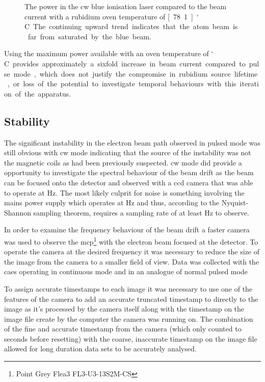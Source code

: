 \begin{figure}
    \center
    
    \caption[Beam current and ionisation laser power.]{The power in the \gls{cw} blue ionisation laser compared to the beam current with a rubidium oven temperature of \unit[78.1]{$^\circ$C}.
    The continuing upward trend indicates that the atom beam is far from saturated by the blue beam.}
    \label{figure:blue_power}
\end{figure}

Using the maximum power available with an oven temperature of \unit[200]{$^\circ$C} provides approximately a sixfold increase in beam current compared to pulse mode, which does not justify the compromise in rubidium source lifetime, or loss of the potential to investigate temporal behaviours with this iteration of the apparatus.

\subsection{Stability}\label{section:stability}

The significant instability in the electron beam path observed in pulsed mode was still obvious with \gls{cw} mode indicating that the source of the instability was not the magnetic coils as had been previously suspected.
\Gls{cw} mode did provide a opportunity to investigate the spectral behaviour of the beam drift as the beam can be focused onto the detector and observed with a \gls{ccd} camera that was able to operate at \unit[240]{Hz}.
The most likely culprit for noise is something involving the mains power supply which operates at \unit[50]{Hz} and thus, according to the Nyquist-Shannon sampling theorem, requires a sampling rate of at least \unit[100]{Hz} to observe.

In order to examine the frequency behaviour of the beam drift a faster camera was used to observe the \gls{mcp}\footnote{Point Grey Flea3 FL3-U3-13S2M-CS} with the electron beam focused at the detector.
To operate the camera at the desired frequency it was necessary to reduce the size of the image from the camera to a smaller field of view.
Data was collected with the \gls{caes} operating in continuous mode and in an analogue of normal pulsed mode

To assign accurate timestamps to each image it was necessary to use one of the features of the camera to add an accurate truncated timestamp to directly to the image as it's processed by the camera itself along with the timestamp on the image file create by the computer the camera was running on.
The combination of the fine and accurate timestamp from the camera (which only counted to \unit[128]{seconds} before resetting) with the coarse, inaccurate timestamp on the image file allowed for long duration data sets to be accurately analysed.

